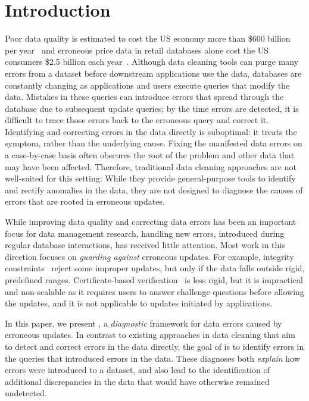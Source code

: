 
\section{Introduction}
\label{s:intro}

Poor data quality is estimated to cost the US economy more than \$600 billion
per year~\cite{eckerson2002} and erroneous price data in retail databases
alone cost the US consumers \$2.5 billion each year~\cite{Fan2008}. Although data
cleaning tools can purge many errors from a dataset before downstream 
applications use the data, databases are constantly changing as applications
and users execute queries that modify the data.
Mistakes in these queries can introduce errors that spread through the database
due to subsequent update queries; 
by the time errors are detected, it is difficult to trace those errors back to the 
erroneous query and correct it.
Identifying and correcting errors in the data directly is suboptimal: it treats the symptom,
rather than the underlying cause. Fixing the manifested data errors on a
case-by-case basis often obscures the root of the problem and other data that may have been
affected. Therefore, traditional data cleaning approaches are not well-suited
for this setting: While they provide general-purpose tools to identify and
rectify anomalies in the data, they are not designed to diagnose the causes of
errors that are rooted in erroneous updates.

While improving data quality and correcting data errors has been an important
focus for data management research, handling new errors, introduced during
regular database interactions, has received little attention. Most work in
this direction focuses on \emph{guarding against} erroneous updates. For
example, integrity constraints~\cite{Khoussainova2006} reject some improper
updates, but only if the data falls outside rigid, predefined ranges.
Certificate-based verification~\cite{Chen2011} is less rigid, but it is
impractical and non-scalable as it requires users to answer challenge
questions before allowing the updates, and it is not applicable to updates
initiated by applications.


In this paper, we present \sys, a \emph{diagnostic} framework for data errors
caused by erroneous updates. In contrast to existing approaches in data
cleaning that aim to detect and correct errors in the data directly, the goal
of \sys is to identify errors in the queries that introduced errors in the
data. These diagnoses both \emph{explain} how errors were introduced to a
dataset, and also lead to the identification of additional discrepancies in
the data that would have otherwise remained undetected.


